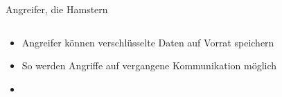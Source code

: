 \begin{frame}[T]{Angreifer, die Hamstern}

  \begin{columns}[T,fullwidth]
    \hfill
    \begin{column}{.5\textwidth}
      \vspace{4em}
      \begin{itemize}
        \item Angreifer können verschlüsselte Daten auf Vorrat speichern
        \vspace{.8em}
        \item So werden Angriffe auf vergangene Kommunikation möglich
        \vspace{.8em}
        \item {}
      \end{itemize}
    \end{column}

    \begin{column}{.6\textwidth}
      \vspace{4em}
    \end{column}
  \end{columns}

\end{frame}
